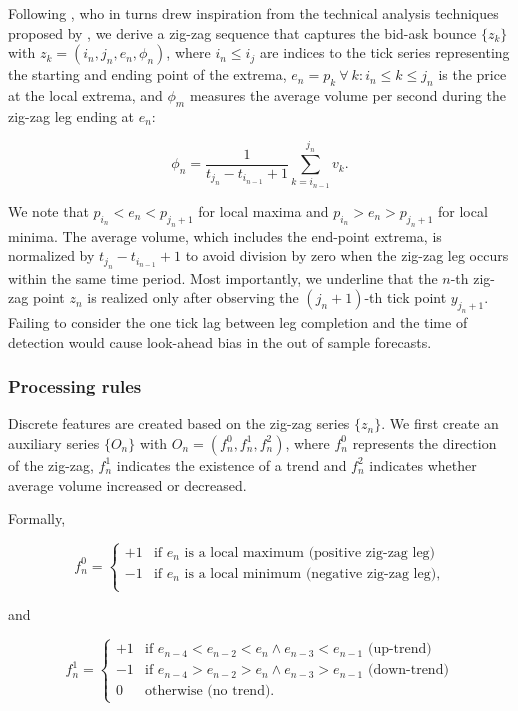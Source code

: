 \documentclass[]{article}
\begin{document}
Following \citet{tayal2009regime}, who in turns drew inspiration from
the technical analysis techniques proposed by \citet{ord2008secret}, we
derive a zig-zag sequence that captures the bid-ask bounce \(\{z_k\}\)
with \(z_k = (i_n, j_n, e_n, \phi_n)\), where \(i_n \le i_j\) are
indices to the tick series representing the starting and ending point of
the extrema, \(e_n = p_k \ \forall \ k : i_n \le k \le j_n\) is the
price at the local extrema, and \(\phi_m\) measures the average volume
per second during the zig-zag leg ending at \(e_n\):

\[
\phi_n = \frac{1}{t_{j_n} - t_{i_{n-1}} + 1} \sum_{k = i_{n-1}}^{j_n}{v_k}.
\]

We note that \(p_{i_n} < e_n < p_{j_n + 1}\) for local maxima and
\(p_{i_n} > e_n > p_{j_n + 1}\) for local minima. The average volume,
which includes the end-point extrema, is normalized by
\(t_{j_{n}} - t_{i_{n-1}} + 1\) to avoid division by zero when the
zig-zag leg occurs within the same time period. Most importantly, we
underline that the \(n\)-th zig-zag point \(z_n\) is realized only after
observing the \((j_n + 1)\)-th tick point \(y_{j_n + 1}\). Failing to
consider the one tick lag between leg completion and the time of
detection would cause look-ahead bias in the out of sample forecasts.

\subsubsection{Processing rules}\label{processing-rules}

Discrete features are created based on the zig-zag series \(\{z_n\}\).
We first create an auxiliary series \(\{O_n\}\) with
\(O_n = (f_n^0, f_n^1, f_n^2)\), where \(f_n^0\) represents the
direction of the zig-zag, \(f_n^1\) indicates the existence of a trend
and \(f_n^2\) indicates whether average volume increased or decreased.

Formally,

\[
f_n^0 =
\begin{cases}
+1 & \text{if $e_n$ is a local maximum (positive zig-zag leg)} \\
-1 & \text{if $e_n$ is a local minimum (negative zig-zag leg),} \\
\end{cases}
\]

and

\[
f_n^1 =
\begin{cases}
+1 & \text{if $e_{n-4} < e_{n-2} < e_{n} \wedge e_{n-3} < e_{n-1}$ (up-trend)} \\
-1 & \text{if $e_{n-4} > e_{n-2} > e_{n} \wedge e_{n-3} > e_{n-1}$ (down-trend)} \\
 0 & \text{otherwise (no trend).}
\end{cases}
\]
\end{document}
